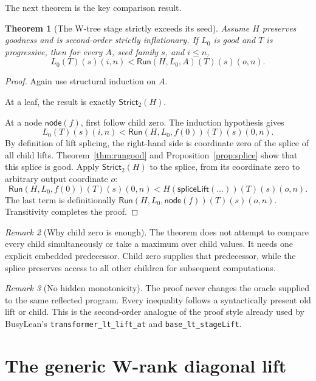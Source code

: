 \documentclass[11pt]{article}
\newtheorem{theorem}{Theorem}[section]
\theoremstyle{definition}
\theoremstyle{remark}
\newtheorem{remark}[theorem]{Remark}
\newcommand{\code}[1]{\texttt{#1}}
\newcommand{\Run}{\mathsf{Run}}
\begin{document}
The next theorem is the key comparison result.

\begin{theorem}[The W-tree stage strictly exceeds its seed]\label{thm:seedlt}
Assume \(H\) preserves goodness and is second-order strictly inflationary.  If
\(L_0\) is good and \(T\) is progressive, then for every \(A\), seed family
\(s\), and \(i\le n\),
\[
L_0(T)(s)(i,n)<\Run(H,L_0,A)(T)(s)(o,n).
\]
\end{theorem}

\begin{proof}
Again use structural induction on \(A\).

At a leaf, the result is exactly \(\mathsf{Strict}_2(H)\).

At a node \(\mathsf{node}(f)\), first follow child zero.  The induction
hypothesis gives
\[
L_0(T)(s)(i,n)<\Run(H,L_0,f(0))(T)(s)(0,n).
\]
By definition of lift splicing, the right-hand side is coordinate zero of the
splice of all child lifts.  Theorem~\ref{thm:rungood} and
Proposition~\ref{prop:splice} show that this splice is good.  Apply
\(\mathsf{Strict}_2(H)\) to the splice, from its coordinate zero to arbitrary
output coordinate \(o\):
\[
\Run(H,L_0,f(0))(T)(s)(0,n)
< H(\mathsf{spliceLift}(\ldots))(T)(s)(o,n).
\]
The last term is definitionally
\(\Run(H,L_0,\mathsf{node}(f))(T)(s)(o,n)\).  Transitivity completes the
proof.
\end{proof}

\begin{remark}[Why child zero is enough]
The theorem does not attempt to compare every child simultaneously or take a
maximum over child values.  It needs one explicit embedded predecessor.  Child
zero supplies that predecessor, while the splice preserves access to all other
children for subsequent computations.
\end{remark}

\begin{remark}[No hidden monotonicity]
The proof never changes the oracle supplied to the same reflected program.
Every inequality follows a syntactically present old lift or child.  This is the
second-order analogue of the proof style already used by BusyLean's
\code{transformer\_lt\_lift\_at} and \code{base\_lt\_stageLift}.
\end{remark}

\section{The generic W-rank diagonal lift}
\end{document}
